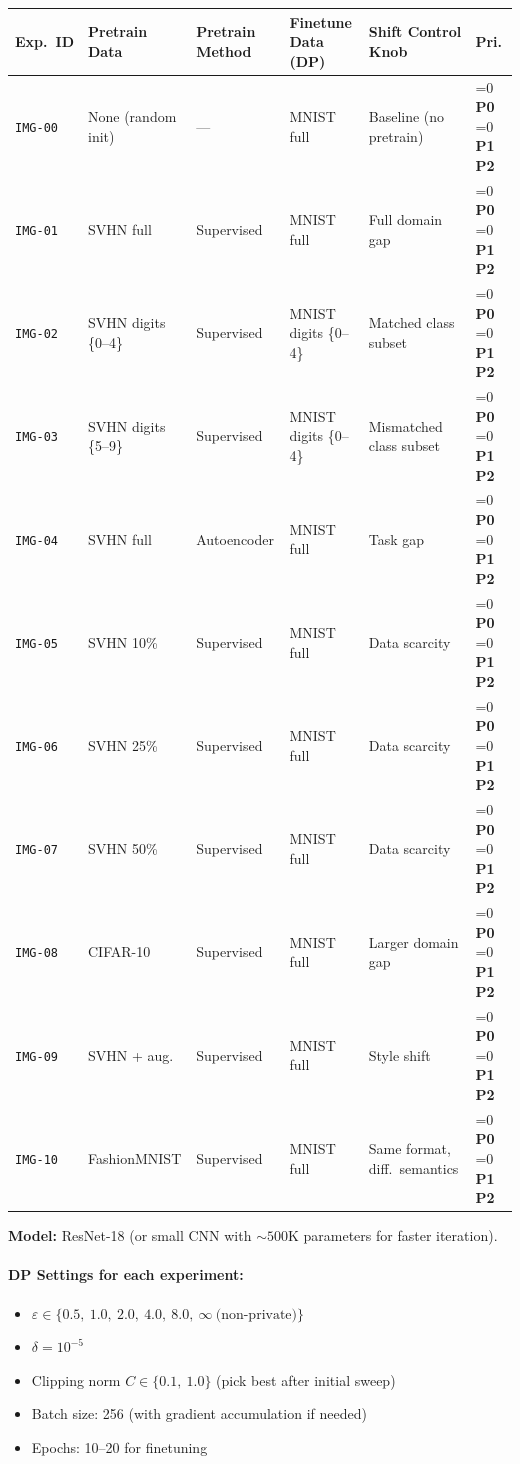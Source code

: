 \documentclass[11pt,a4paper]{article}
\newcommand{\ptag}[1]{%
    \ifnum\pdfstrcmp{#1}{P0}=0
        {\textcolor{p0color}{\textbf{P0}}}%
    \else\ifnum\pdfstrcmp{#1}{P1}=0
        {\textcolor{p1color}{\textbf{P1}}}%
    \else
        {\textcolor{p2color}{\textbf{P2}}}%
    \fi\fi
}
\begin{document}
\begin{small}
\begin{longtable}{@{}p{1.2cm}p{2.5cm}p{2.2cm}p{2.3cm}p{3cm}p{0.6cm}@{}}
\toprule
\textbf{Exp.\ ID} & \textbf{Pretrain Data} & \textbf{Pretrain Method} & \textbf{Finetune Data (DP)} & \textbf{Shift Control Knob} & \textbf{Pri.} \\
\midrule
\endhead
\texttt{IMG-00} & None (random init) & --- & MNIST full & Baseline (no pretrain) & \ptag{P0} \\
\texttt{IMG-01} & SVHN full & Supervised & MNIST full & Full domain gap & \ptag{P0} \\
\texttt{IMG-02} & SVHN digits \{0--4\} & Supervised & MNIST digits \{0--4\} & Matched class subset & \ptag{P0} \\
\texttt{IMG-03} & SVHN digits \{5--9\} & Supervised & MNIST digits \{0--4\} & Mismatched class subset & \ptag{P0} \\
\texttt{IMG-04} & SVHN full & Autoencoder & MNIST full & Task gap & \ptag{P1} \\
\texttt{IMG-05} & SVHN 10\% & Supervised & MNIST full & Data scarcity & \ptag{P1} \\
\texttt{IMG-06} & SVHN 25\% & Supervised & MNIST full & Data scarcity & \ptag{P1} \\
\texttt{IMG-07} & SVHN 50\% & Supervised & MNIST full & Data scarcity & \ptag{P1} \\
\texttt{IMG-08} & CIFAR-10 & Supervised & MNIST full & Larger domain gap & \ptag{P1} \\
\texttt{IMG-09} & SVHN + aug. & Supervised & MNIST full & Style shift & \ptag{P2} \\
\texttt{IMG-10} & FashionMNIST & Supervised & MNIST full & Same format, diff.\ semantics & \ptag{P2} \\
\bottomrule
\end{longtable}
\end{small}

\textbf{Model:} ResNet-18 (or small CNN with ${\sim}500$K parameters for faster iteration).

\paragraph{DP Settings for each experiment:}
\begin{itemize}[nosep]
    \item $\varepsilon \in \{0.5,\ 1.0,\ 2.0,\ 4.0,\ 8.0,\ \infty\ \text{(non-private)}\}$
    \item $\delta = 10^{-5}$
    \item Clipping norm $C \in \{0.1,\ 1.0\}$ (pick best after initial sweep)
    \item Batch size: 256 (with gradient accumulation if needed)
    \item Epochs: 10--20 for finetuning
\end{itemize}
\end{document}

